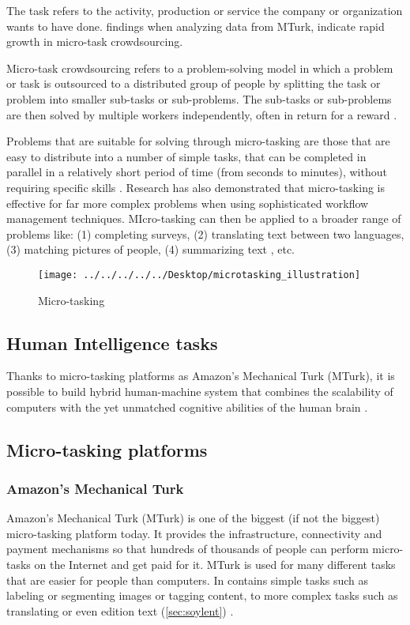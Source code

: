 The task refers to the activity, production or service the company or organization wants to have done. \cite{Gadiraju2015} findings when analyzing data from MTurk, indicate rapid growth in micro-task crowdsourcing. 

Micro-task crowdsourcing refers to a problem-solving model in which a problem or task is outsourced to a distributed group of people by splitting the task or problem into smaller sub-tasks or sub-problems. The sub-tasks or sub-problems are then solved by multiple workers independently, often in return for a reward \citep{Sarasua2012}. 

Problems that are suitable for solving through micro-tasking are those that are easy to distribute into a number of simple tasks, that can be completed in parallel in a relatively short period of time (from seconds to minutes), without requiring specific skills \citep{Sarasua2012}. Research has also demonstrated that micro-tasking is effective for far more complex problems when using sophisticated workflow management techniques. MIcro-tasking can then be applied to a broader range of problems like: (1) completing surveys, (2) translating text between two languages, (3) matching pictures of people, (4) summarizing text \citep{Bernstein2015a}, etc. 

\begin{figure}[H]
	\centering
	\texttt{[image: ../../../../../Desktop/microtasking\_illustration]}
	\caption{Micro-tasking \citep{Michelucci2015}}
	\label{fig:microtaskingillustration}
\end{figure}


\subsection{Human Intelligence tasks}
Thanks to micro-tasking platforms as Amazon's Mechanical Turk (MTurk), it is possible to build hybrid human-machine system that combines the scalability of computers with the yet unmatched cognitive abilities of the human brain \citep{Difallah2016}.

\subsection{Micro-tasking platforms}
\subsubsection[MTurk]{Amazon's Mechanical Turk}
Amazon's Mechanical Turk (MTurk) is one of the biggest (if not the biggest) micro-tasking platform today. It provides the infrastructure, connectivity and payment mechanisms so that hundreds of thousands of people can perform micro-tasks on the Internet and get paid for it. MTurk is used for many different tasks that are easier for people than computers. In contains simple tasks such as labeling or segmenting images or tagging content, to more complex tasks such as translating or even edition text (\ref{sec:soylent}) \citep{Franklin2011}.  

